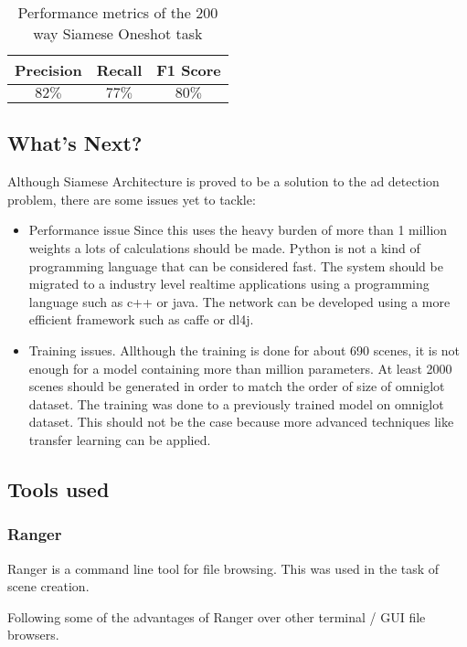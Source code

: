 \begin{table}[h!]
\caption{Performance metrics of the 200 way Siamese Oneshot task}
\label{table:siamese-results}
\centering

\begin{tabular}{||c| c| c||} 
 \hline
 Precision & Recall & F1 Score \\ [0.5ex] 
 \hline\hline
 $82\%$ & $77\%$ & $80\%$ \\ [1ex] 
 \hline
\end{tabular}


\end{table}

\subsection{What's Next?}
Although Siamese Architecture is proved to be a solution to the ad detection problem, there are some issues yet to tackle:
\begin{itemize}
\item Performance issue
\subitem Since this uses the heavy burden of more than 1 million weights a lots of calculations should be made. Python is not a kind of programming language that can be considered fast.
\subitem The system should be migrated to a industry level realtime applications using a programming language such as c++ or java. 
\subitem The network can be developed using a more efficient framework such as caffe or dl4j.
\item Training issues. 
\subitem Allthough the training is done for about 690 scenes, it is not enough for a model containing more than million parameters.
\subitem At least 2000 scenes should be generated in order to match the order of size of omniglot dataset.
\subitem The training was done to a previously trained model on omniglot dataset. This should not be the case because more advanced techniques like transfer learning can be applied.
\end{itemize}
\subsection{Tools used}

\subsubsection{Ranger}
Ranger is a command line tool for file browsing. This was used in the task of scene creation.

Following some of the advantages of Ranger over other terminal / GUI file browsers.

